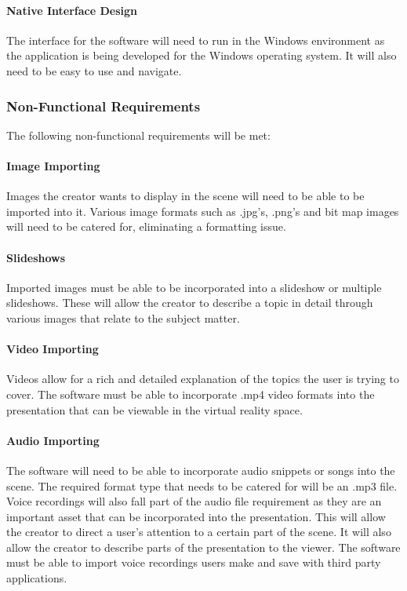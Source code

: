 		\paragraph{Native Interface Design}

		The interface for the software will need to run in the Windows environment as the application is being developed for the Windows operating system.
		It will also need to be easy to use and navigate.

	\subsubsection{Non-Functional Requirements}

	The following non-functional requirements will be met:

		\paragraph{Image Importing}

		Images the creator wants to display in the scene will need to be able to be imported into it.
		Various image formats such as .jpg's, .png's and bit map images will need to be catered for, eliminating a formatting issue.

		\paragraph{Slideshows}

		Imported images must be able to be incorporated into a slideshow or multiple slideshows.
		These will allow the creator to describe a topic in detail through various images that relate to the subject matter.

		\paragraph{Video Importing}

		Videos allow for a rich and detailed explanation of the topics the user is trying to cover.
		The software must be able to incorporate .mp4 video formats into the presentation that can be viewable in the virtual reality space.

		\paragraph{Audio Importing}

		The software will need to be able to incorporate audio snippets or songs into the scene.
		The required format type that needs to be catered for will be an .mp3 file.
		Voice recordings will also fall part of the audio file requirement as they are an important asset that can be incorporated into the presentation.
		This will allow the creator to direct a user’s attention to a certain part of the scene.
		It will also allow the creator to describe parts of the presentation to the viewer.
		The software must be able to import voice recordings users make and save with third party applications.

